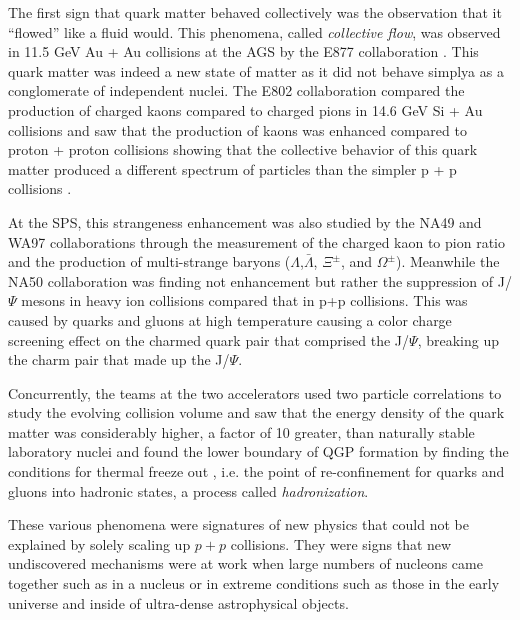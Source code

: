 The first sign that quark matter behaved collectively was the observation that it ``flowed'' like a fluid would. This phenomena, called \textit{collective flow}, was observed in 11.5 GeV Au + Au collisions at the AGS by the E877 collaboration \citep{Barrette:1999rx}. This quark matter was indeed a new state of matter as it did not behave simplya as a conglomerate of independent nuclei. The E802 collaboration compared the production of charged kaons compared to charged pions in 14.6 GeV Si + Au collisions and saw that the production of kaons was enhanced compared to proton + proton collisions showing that the collective behavior of this quark matter produced a different spectrum of particles than the simpler p + p collisions \citep{PhysRevLett.64.847}. 

At the SPS, this strangeness enhancement was also studied by the NA49\citep{Hohne:1999jf} and WA97 collaborations through the measurement of the charged kaon to pion ratio and the production of multi-strange baryons ($\Lambda$,$\bar{\Lambda}$, $\Xi^{\pm}$, and $\Omega^{\pm}$). Meanwhile the NA50 collaboration was finding not enhancement but rather the suppression of J/$\Psi$ mesons in heavy ion collisions compared that in p+p collisions\citep{Abreu:2000ni}. This was caused by quarks and gluons at high temperature causing a color charge screening effect on the charmed quark pair that comprised the J/$\Psi$, breaking up the charm pair that made up the J/$\Psi$.

Concurrently, the teams at the two accelerators used two particle correlations to study the evolving collision volume and saw that the energy density of the quark matter was considerably higher, a factor of 10 greater, than naturally stable laboratory nuclei \citep{Heinz:1999rw} and found the lower boundary of QGP formation by finding the conditions for thermal freeze out \citep{BraunMunzinger:1998cg}, i.e. the point of re-confinement for quarks and gluons into hadronic states, a process called \textit{hadronization}.

These various phenomena were signatures of new physics that could not be explained by solely scaling up $p+p$ collisions. They were signs that new undiscovered mechanisms were at work when large numbers of nucleons came together such as in a nucleus or in extreme conditions such as those in the early universe and inside of ultra-dense astrophysical objects. 
\pagebreak
\pagebreak

